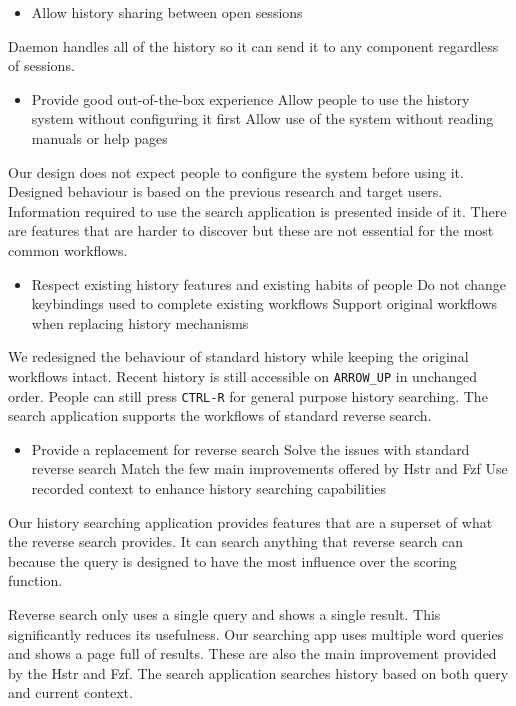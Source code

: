 \begin{itemize}
    \item Allow history sharing between open sessions
\end{itemize}
Daemon handles all of the history so it can send it to any component regardless of sessions.

\begin{itemize}
    \item Provide good out-of-the-box experience 
    \subitem Allow people to use the history system without configuring it first
    \subitem Allow use of the system without reading manuals or help pages
\end{itemize}
Our design does not expect people to configure the system before using it. Designed behaviour is based on the previous research and target users. Information required to use the search application is presented inside of it. There are features that are harder to discover but these are not essential for the most common workflows. 
    
\begin{itemize}
    \item Respect existing history features and existing habits of people
    \subitem Do not change keybindings used to complete existing workflows
    \subitem Support original workflows when replacing history mechanisms
\end{itemize}
We redesigned the behaviour of standard history while keeping the original workflows intact. Recent history is still accessible on \verb|ARROW_UP| in unchanged order. People can still press \verb|CTRL-R| for general purpose history searching. 
The search application supports the workflows of standard reverse search.
    
\begin{itemize}
    \item Provide a replacement for reverse search
    \subitem Solve the issues with standard reverse search
    \subitem Match the few main improvements offered by Hstr and Fzf
    \subitem Use recorded context to enhance history searching capabilities
\end{itemize}
Our history searching application provides features that are a superset of what the reverse search provides. It can search anything that reverse search can because the query is designed to have the most influence over the scoring function.

Reverse search only uses a single query and shows a single result. This significantly reduces its usefulness. Our searching app uses multiple word queries and shows a page full of results. These are also the main improvement provided by the Hstr and Fzf.
The search application searches history based on both query and current context.


